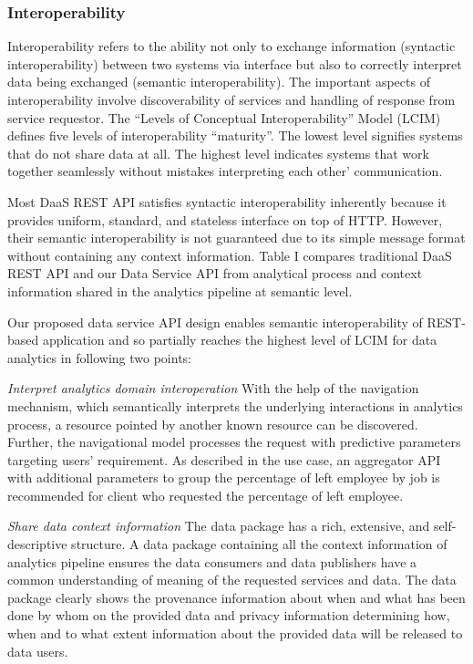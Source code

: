 \documentclass[10pt, conference, compsocconf]{IEEEtran}
\begin{document}
\subsubsection{Interoperability}Interoperability refers to the ability not only to exchange information (syntactic interoperability) between two systems via interface but also to correctly interpret data being exchanged (semantic interoperability). The important aspects of interoperability involve discoverability of services and handling of response from service requestor\cite{clements2002software}. The “Levels of Conceptual Interoperability” Model (LCIM) defines five levels of interoperability “maturity”. The lowest level signifies systems that do not share data at all. The highest level indicates systems that work together seamlessly without mistakes interpreting each other’ communication\cite{tolk2003levels}. 

Most DaaS REST API satisfies syntactic interoperability inherently because it provides uniform, standard, and stateless interface on top of HTTP. However, their semantic interoperability is not guaranteed due to its simple message format without containing any context information. Table I compares traditional DaaS REST API and our Data Service API from  analytical process and context information shared in the analytics pipeline at semantic level. 

Our proposed data service API design enables semantic interoperability of REST-based application and so partially reaches the highest level of LCIM for data analytics in following two points: 

\textit{Interpret analytics domain interoperation} With the help of the navigation mechanism, which semantically interprets the underlying interactions in analytics process, a resource pointed by another known resource can be discovered. Further, the navigational model processes the request with predictive parameters targeting users’ requirement. As described in the use case, an aggregator API with additional parameters to group the percentage of left employee by job is recommended for client who requested the percentage of left employee.

\textit{Share data context information} The data package has a rich, extensive, and self-descriptive structure.  A data package containing all the context information of analytics pipeline ensures the data consumers and data publishers have a common understanding of meaning of the requested services and data. The data package clearly shows the provenance information about when and what has been done by whom on the provided data and privacy information determining how, when and to what extent information about the provided data will be released to data users.
\end{document}

